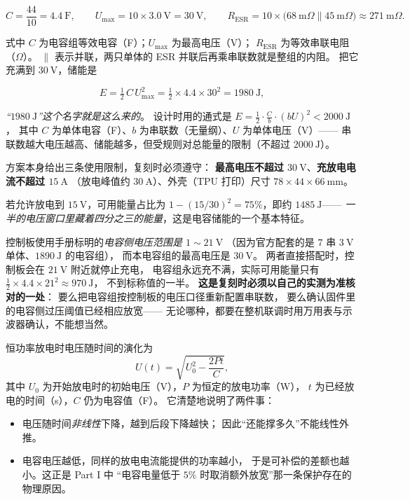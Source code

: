 \documentclass[cn,blue,11pt,device=normal]{elegantnote}
\begin{document}
\begin{equation}
  C = \frac{44}{10} = 4.4\ \mathrm{F},\qquad
  U_{\max} = 10\times 3.0\ \mathrm{V} = 30\ \mathrm{V},\qquad
  R_{\mathrm{ESR}} = 10\times\bigl(68\ \mathrm{m}\Omega \parallel 45\ \mathrm{m}\Omega\bigr)
                   \approx 271\ \mathrm{m}\Omega .
\end{equation}

式中 $C$ 为电容组等效电容（F）；$U_{\max}$ 为最高电压（V）；
$R_{\mathrm{ESR}}$ 为等效串联电阻（$\Omega$）。
$\parallel$ 表示并联，两只单体的 ESR 并联后再乘串联数就是整组的内阻。
把它充满到 $30\ \mathrm{V}$，储能是

\begin{equation}\label{eq:1980j}
  E = \tfrac{1}{2}\,C\,U_{\max}^{2}
    = \tfrac{1}{2}\times 4.4\times 30^{2} = 1980\ \mathrm{J},
\end{equation}

\emph{“$1980\ \mathrm{J}$”这个名字就是这么来的}。
设计时用的通式是 $E=\frac12\cdot\frac{C}{b}\cdot(bU)^{2}<2000\ \mathrm{J}$，
其中 $C$ 为单体电容（F）、$b$ 为串联数（无量纲）、$U$ 为单体电压（V）——
串联数越大电压越高、储能越多，但受规则对总能量的限制（不超过 $2000\ \mathrm{J}$）。

方案本身给出三条使用限制，复刻时必须遵守：
\textbf{最高电压不超过 $30\ \mathrm{V}$}、\textbf{充放电电流不超过 $15\ \mathrm{A}$}
（放电峰值约 $30\ \mathrm{A}$）、外壳（TPU 打印）尺寸
$78\times44\times66\ \mathrm{mm}$。

若允许放电到 $15\ \mathrm{V}$，可用能量占比为
$1-(15/30)^{2}=75\%$，即约 $1485\ \mathrm{J}$——
\emph{一半的电压窗口里藏着四分之三的能量}，这是电容储能的一个基本特征。

\begin{note}
控制板使用手册标明的\emph{电容侧电压范围是 $1\sim21\ \mathrm{V}$}
（因为官方配套的是 $7$ 串 $3\ \mathrm{V}$ 单体、$1890\ \mathrm{J}$ 的电容组），
而本电容组的最高电压是 $30\ \mathrm{V}$。
两者直接搭配时，控制板会在 $21\ \mathrm{V}$ 附近就停止充电，
电容组永远充不满，实际可用能量只有 $\tfrac12\times4.4\times21^{2}\approx970\ \mathrm{J}$，
不到标称值的一半。
\textbf{这是复刻时必须以自己的实测为准核对的一处}：
要么把电容组按控制板的电压口径重新配置串联数，
要么确认固件里的电容侧过压阈值已经相应放宽——
无论哪种，都要在整机联调时用万用表与示波器确认，不能想当然。
\end{note}

恒功率放电时电压随时间的演化为
\begin{equation}\label{eq:capdischarge}
  U(t) = \sqrt{U_0^{2} - \frac{2Pt}{C}} ,
\end{equation}
其中 $U_0$ 为开始放电时的初始电压（V），$P$ 为恒定的放电功率（W），
$t$ 为已经放电的时间（s），$C$ 仍为电容值（F）。
它清楚地说明了两件事：
\begin{itemize}
  \item 电压随时间\emph{非线性}下降，越到后段下降越快；
  因此“还能撑多久”不能线性外推。
  \item 电容电压越低，同样的放电电流能提供的功率越小，
  于是可补偿的差额也越小。这正是 Part I 中
  “电容电量低于 $5\%$ 时取消额外放宽”那一条保护存在的物理原因。
\end{itemize}
\end{document}
